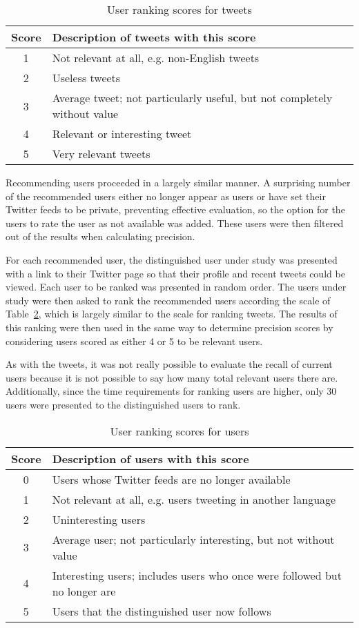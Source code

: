 \begin{table}
\centering
\begin{tabular}{c|l}
{\bf Score} & {\bf Description of tweets with this score} \\ \hline
1 & Not relevant at all, e.g. non-English tweets \\ \hline
2 & Useless tweets \\ \hline
3 & Average tweet; not particularly useful, but not completely without value \\ \hline
4 & Relevant or interesting tweet \\ \hline
5 & Very relevant tweets \\
\end{tabular}
\caption{User ranking scores for tweets}
\label{tab:UserRankingScoresForTweets}
\end{table}


Recommending users proceeded in a largely similar manner. A surprising number of the recommended users either no longer appear as users or have set their Twitter feeds to be private, preventing effective evaluation, so the option for the users to rate the user as not available was added. These users were then filtered out of the results when calculating precision.

For each recommended user, the distinguished user under study was presented with a link to their Twitter page so that their profile and recent tweets could be viewed. Each user to be ranked was presented in random order. The users under study were then asked to rank the recommended users according the scale of Table~\ref{tab:UserRankingScoresForUsers}, which is largely similar to the scale for ranking tweets. The results of this ranking were then used in the same way to determine precision scores by considering users scored as either 4 or 5 to be relevant users.

As with the tweets, it was not really possible to evaluate the recall of current users because it is not possible to say how many total relevant users there are. Additionally, since the time requirements for ranking users are higher, only 30 users were presented to the distinguished users to rank.


\begin{table}
\centering
\begin{tabular}{c|l}
{\bf Score} & {\bf Description of users with this score} \\ \hline
0 & Users whose Twitter feeds are no longer available \\ \hline
1 & Not relevant at all, e.g. users tweeting in another language \\ \hline
2 & Uninteresting users \\ \hline
3 & Average user; not particularly interesting, but not without value \\ \hline
4 & Interesting users;  includes users who once were followed but no longer are \\ \hline
5 & Users that the distinguished user now follows \\
\end{tabular}
\caption{User ranking scores for users}
\label{tab:UserRankingScoresForUsers}
\end{table}


